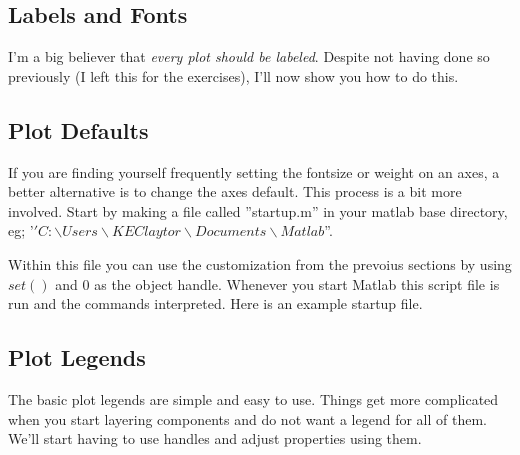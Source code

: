 \begin{quote}

\end{quote}

\pagebreak
\subsection{Labels and Fonts}
I'm a big believer that \emph{every plot should be labeled}.
 Despite not having done so previously (I left this for the exercises), I'll now show you how to do this.

\begin{quote}

\end{quote}

\pagebreak
\subsection{Plot Defaults}
If you are finding yourself frequently setting the fontsize or weight on an axes, a better alternative is to change the axes default.
 This process is a bit more involved.
 Start by making a file called ''startup.m'' in your matlab base directory, eg; '$'C:\backslash Users\backslash KEClaytor\backslash Documents\backslash Matlab$''.

Within this file you can use the customization from the prevoius sections by using $set()$ and $0$ as the object handle.
 Whenever you start Matlab this script file is run and the commands interpreted.
 Here is an example startup file.
 
\begin{quote}

\end{quote}

\pagebreak
\subsection{Plot Legends}
The basic plot legends are simple and easy to use.
 Things get more complicated when you start layering components and do not want a legend for all of them.
 We'll start having to use handles and adjust properties using them.

\begin{quote}

\end{quote}
